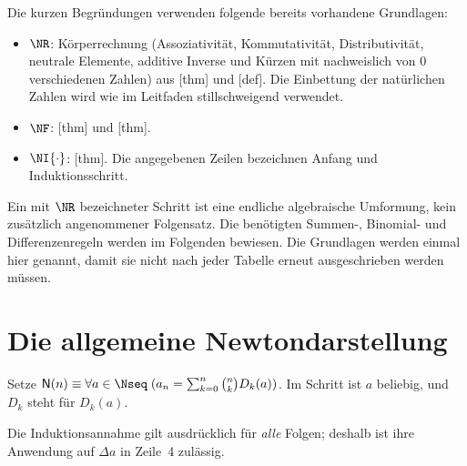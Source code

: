 Die kurzen Begründungen verwenden folgende bereits vorhandene Grundlagen:
\begin{itemize}
\item $\NR$: Körperrechnung (Assoziativität, Kommutativität,
Distributivität, neutrale Elemente, additive Inverse und Kürzen mit
nachweislich von $0$ verschiedenen Zahlen) aus
[thm] und
[def]. Die Einbettung der
natürlichen Zahlen wird wie im Leitfaden stillschweigend verwendet.
\item $\NF$: [thm] und
[thm].
\item $\NI{\cdot}$: [thm].
Die angegebenen Zeilen bezeichnen Anfang und Induktionsschritt.
\end{itemize}
Ein mit $\NR$ bezeichneter Schritt ist eine endliche algebraische
Umformung, kein zusätzlich angenommener Folgensatz. Die benötigten
Summen-, Binomial- und Differenzenregeln werden im Folgenden bewiesen.
Die Grundlagen werden einmal hier genannt, damit sie nicht nach jeder
Tabelle erneut ausgeschrieben werden müssen.



\section*{Die allgemeine Newtondarstellung}
Setze $\mathsf N(n)\equiv
\forall a\in\Nseq\;(a_n=\sum_{k=0}^n\binom nkD_k(a))$.
Im Schritt ist $a$ beliebig, und $D_k$ steht für $D_k(a)$.
\begin{tabproofwide}
\end{tabproofwide}
Die Induktionsannahme gilt ausdrücklich für \emph{alle} Folgen;
deshalb ist ihre Anwendung auf $\Delta a$ in Zeile~4 zulässig.

